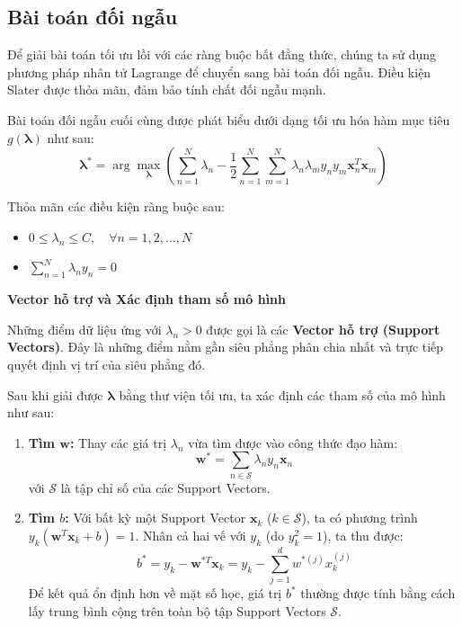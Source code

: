\documentclass[../DoAn.tex]{subfiles}
\begin{document}
\subsection{Bài toán đối ngẫu}
\label{subsec:dual_problem}

Để giải bài toán tối ưu lồi với các ràng buộc bất đẳng thức, chúng ta sử dụng phương pháp nhân tử Lagrange để chuyển sang bài toán đối ngẫu. Điều kiện Slater được thỏa mãn, đảm bảo tính chất đối ngẫu mạnh.

Bài toán đối ngẫu cuối cùng được phát biểu dưới dạng tối ưu hóa hàm mục tiêu $g(\boldsymbol{\lambda})$ như sau:
\begin{equation}
    \boldsymbol{\lambda}^* = \arg\max_{\boldsymbol{\lambda}} \left( \sum_{n=1}^{N} \lambda_n - \frac{1}{2} \sum_{n=1}^{N} \sum_{m=1}^{N} \lambda_n \lambda_m y_n y_m \mathbf{x}_n^T \mathbf{x}_m \right)
    \label{eq:svm_dual_problem}
\end{equation}

Thỏa mãn các điều kiện ràng buộc sau:
\begin{itemize}
    \item $0 \leq \lambda_n \leq C, \quad \forall n = 1, 2, \dots, N$
    \item $\sum_{n=1}^{N} \lambda_n y_n = 0$\\
\end{itemize}

\textbf{Vector hỗ trợ và Xác định tham số mô hình}

Những điểm dữ liệu ứng với $\lambda_n > 0$ được gọi là các \textbf{Vector hỗ trợ (Support Vectors)}. Đây là những điểm nằm gần siêu phẳng phân chia nhất và trực tiếp quyết định vị trí của siêu phẳng đó.

Sau khi giải được $\boldsymbol{\lambda}$ bằng thư viện tối ưu, ta xác định các tham số của mô hình như sau:
\begin{enumerate}
    \item \textbf{Tìm $\mathbf{w}$:} Thay các giá trị $\lambda_n$ vừa tìm được vào công thức đạo hàm:
    \begin{equation}
        \mathbf{w}^* = \sum_{n \in \mathcal{S}} \lambda_n y_n \mathbf{x}_n
    \end{equation}
    với $\mathcal{S}$ là tập chỉ số của các Support Vectors.
    \item \textbf{Tìm $b$:} Với bất kỳ một Support Vector $\mathbf{x}_k$ ($k \in \mathcal{S}$), ta có phương trình $y_k(\mathbf{w}^T \mathbf{x}_k + b) = 1$. Nhân cả hai vế với $y_k$ (do $y_k^2 = 1$), ta thu được:
    \begin{equation}
        b^* = y_k - \mathbf{w}^{*T} \mathbf{x}_k = y_k - \sum_{j=1}^{d} w^{*(j)} x_k^{(j)}
    \end{equation}
    Để kết quả ổn định hơn về mặt số học, giá trị $b^*$ thường được tính bằng cách lấy trung bình cộng trên toàn bộ tập Support Vectors $\mathcal{S}$.\\
\end{enumerate}
\end{document}
